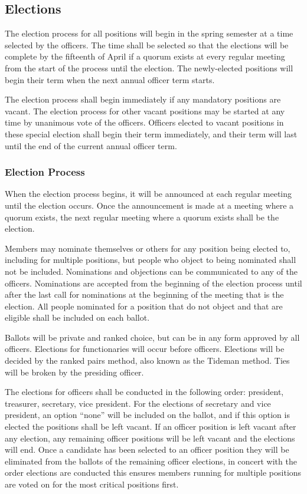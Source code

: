 \documentclass{article}
\begin{document}
\subsection{Elections}

The election process for all positions will begin in the spring semester at a
time selected by the officers. The time shall be selected so that the elections
will be complete by the fifteenth of April if a quorum exists at every regular
meeting from the start of the process until the election. The newly-elected
positions will begin their term when the next annual officer term starts.

The election process shall begin immediately if any mandatory positions are
vacant. The election process for other vacant positions may be started at any
time by unanimous vote of the officers. Officers elected to vacant positions in
these special election shall begin their term immediately, and their term will
last until the end of the current annual officer term.

\subsubsection{Election Process}

When the election process begins, it will be announced at each regular meeting
until the election occurs. Once the announcement is made at a meeting where a
quorum exists, the next regular meeting where a quorum exists shall be the
election.

Members may nominate themselves or others for any position being elected to,
including for multiple positions, but people who object to being nominated shall
not be included. Nominations and objections can be communicated to any of the
officers. Nominations are accepted from the beginning of the election process
until after the last call for nominations at the beginning of the meeting that
is the election. All people nominated for a position that do not object and that
are eligible shall be included on each ballot.

Ballots will be private and ranked choice, but can be in any form approved by
all officers. Elections for functionaries will occur before officers. Elections
will be decided by the ranked pairs method, also known as the Tideman method.
Ties will be broken by the presiding officer.

The elections for officers shall be conducted in the following order: president,
treasurer, secretary, vice president. For the elections of secretary and vice
president, an option ``none'' will be included on the ballot, and if this option
is elected the positions shall be left vacant. If an officer position is left
vacant after any election, any remaining officer positions will be left vacant
and the elections will end. Once a candidate has been selected to an officer
position they will be eliminated from the ballots of the remaining officer
elections, in concert with the order elections are conducted this ensures
members running for multiple positions are voted on for the most critical
positions first.
\end{document}
